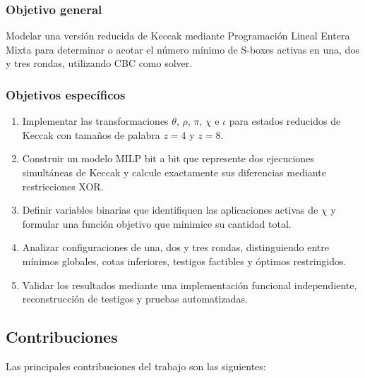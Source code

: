 \subsubsection{Objetivo general}

Modelar una versión reducida de Keccak mediante Programación Lineal Entera
Mixta para determinar o acotar el número mínimo de S-boxes activas en una,
dos y tres rondas, utilizando CBC como solver.


\subsubsection{Objetivos específicos}

\begin{enumerate}
    \item Implementar las transformaciones $\theta$, $\rho$, $\pi$, $\chi$
    e $\iota$ para estados reducidos de Keccak con tamaños de palabra
    $z=4$ y $z=8$.

    \item Construir un modelo MILP bit a bit que represente dos ejecuciones
    simultáneas de Keccak y calcule exactamente sus diferencias mediante
    restricciones XOR.

    \item Definir variables binarias que identifiquen las aplicaciones
    activas de $\chi$ y formular una función objetivo que minimice su
    cantidad total.

    \item Analizar configuraciones de una, dos y tres rondas, distinguiendo
    entre mínimos globales, cotas inferiores, testigos factibles y óptimos
    restringidos.

    \item Validar los resultados mediante una implementación funcional
    independiente, reconstrucción de testigos y pruebas automatizadas.
\end{enumerate}


\subsection{Contribuciones}
\label{subsec:contribuciones}

Las principales contribuciones del trabajo son las siguientes:

